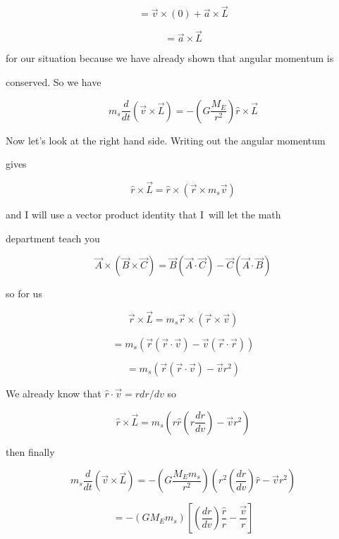 $$=\overrightarrow{v}\times \left( 0\right) +\overrightarrow{a}\times \overrightarrow{L}$$

$$=\overrightarrow{a}\times \overrightarrow{L}$$

for our situation because we have already shown that angular momentum is

conserved. So we have 

$$m_{s}\frac{d}{dt}\left( \overrightarrow{v}\times \overrightarrow{L}\right)=-\left( G\frac{M_{E}}{r^{2}}\right) \hat{r}\times \overrightarrow{L}$$


Now let's look at the right hand side. Writing out the angular momentum

gives 

$$\hat{r}\times \overrightarrow{L}=\hat{r}\times \left( \overrightarrow{r}\times m_{s}\overrightarrow{v}\right) $$

and I will use a vector product identity that I\ will let the math

department teach you

$$\overrightarrow{A}\times \left( \overrightarrow{B}\times \overrightarrow{C}\right) =\overrightarrow{B}\left( \overrightarrow{A}\cdot \overrightarrow{C}\right) -\overrightarrow{C}\left( \overrightarrow{A}\cdot \overrightarrow{B}\right) $$

so for us 

$$\overrightarrow{r}\times \overrightarrow{L}=m_{s}\overrightarrow{r}\times\left( \overrightarrow{r}\times \overrightarrow{v}\right) $$

$$=m_{s}\left( \overrightarrow{r}\left( \overrightarrow{r}\cdot \overrightarrow{v}\right) -\overrightarrow{v}\left( \overrightarrow{r}\cdot \overrightarrow{r}\right) \right) $$

$$=m_{s}\left( \overrightarrow{r}\left( \overrightarrow{r}\cdot \overrightarrow{v}\right) -\overrightarrow{v}r^{2}\right) $$


We already know that $\hat{r}\cdot \overrightarrow{v}=rdr/dv$ so 

$$\hat{r}\times \overrightarrow{L}=m_{s}\left( r\hat{r}\left( r\frac{dr}{dv}\right) -\overrightarrow{v}r^{2}\right) $$

then finally 

$$ m_{s}\frac{d}{dt}\left( \overrightarrow{v}\times \overrightarrow{L}\right)=-\left( G\frac{M_{E}m_{s}}{r^{2}}\right) \left( r^{2}\left( \frac{dr}{dv}\right) \hat{r}-\overrightarrow{v}r^{2}\right) 
$$

$$=-\left( GM_{E}m_{s}\right) \left[ \left( \frac{dr}{dv}\right) \frac{\hat{r}}{r}-\frac{\overrightarrow{v}}{r}\right] $$


